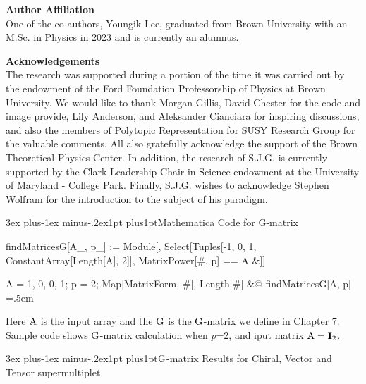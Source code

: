 \documentclass[12pt]{article}
\makeatletter
\newenvironment{lcverbatim}
 {\SaveVerbatim{cverb}}
 {\endSaveVerbatim
  \flushleft\fboxrule=0pt\fboxsep=.5em
  \colorbox{cverbbg}{%
    \makebox[\dimexpr\linewidth-2\fboxsep][l]{\BUseVerbatim{cverb}}%
  }
  \endflushleft
}
\let\bm\relax
\newcommand{\bm}[1]{{\boldsymbol{#1}}}
\def\section{\@startsection{section}{1}{\z@}
        {3ex plus-1ex minus-.2ex}{1pt plus1pt}{\large\sf\bfseries\boldmath}}
\makeatother
\begin{document}
\noindent
{\bf {Author Affiliation}}\\[.1in] \indent
One of the co-authors, Youngik Lee, graduated from Brown University with an M.Sc. in Physics in 2023 and is currently an alumnus. 


\noindent
{\bf {Acknowledgements}}\\[.1in] \indent
The research was supported during a portion of the time it was carried out by the endowment of the Ford Foundation Professorship of Physics at Brown 
University.  
We would like to thank Morgan Gillis, David Chester for the code and image provide, Lily Anderson, and Aleksander Cianciara for inspiring discussions, and also the members of Polytopic Representation for SUSY Research Group for the valuable comments.
All also gratefully acknowledge the support of the Brown Theoretical Physics Center. 
In addition, the research of S.J.G. is currently supported by the Clark Leadership Chair in Science endowment at the University of Maryland - College Park.  Finally, S.J.G. wishes to acknowledge Stephen Wolfram for the introduction to the
subject of his paradigm.









\newpage
\appendix
\section{Mathematica Code for G-matrix}

\begin{lcverbatim}
findMatricesG[A_, p_] := 
 Module[{}, Select[Tuples[{-1, 0, 1}, ConstantArray[Length[A], 2]], 
   MatrixPower[#, p] == A &]]

A = {{1, 0}, {0, 1}}; p = 2; 
{Map[MatrixForm, #], Length[#]} &@ findMatricesG[A, p]
\end{lcverbatim}

Here ${\bm{\rm A}}$ is the input array and the ${\bm{\rm G}}$ is the ${\bm{\rm G}}$-matrix we define in Chapter 7.
Sample code shows ${\bm{\rm G}}$-matrix calculation when  $p$=2, and iput matrix ${\bm{\rm A}}=\mathbf{I}_2$.

\section{${\bm{\rm G}}$-matrix Results for Chiral, Vector and Tensor supermultiplet}
\end{document}
